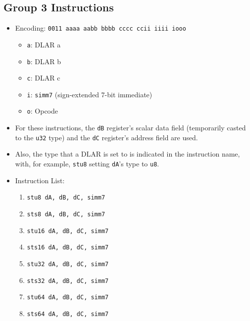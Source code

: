 \documentclass{article}
\begin{document}
	\subsection{Group 3 Instructions}
		\begin{itemize}
		\item Encoding: \texttt{0011 aaaa aabb bbbb  cccc ccii iiii iooo}
			\begin{itemize}
			\item \texttt{a}: DLAR a
			\item \texttt{b}: DLAR b
			\item \texttt{c}: DLAR c
			\item \texttt{i}: \texttt{simm7} (sign-extended 7-bit
				immediate)
			\item \texttt{o}: Opcode
			\end{itemize}
		\item For these instructions, the \texttt{dB} register's scalar
			data field (temporarily casted to the \texttt{u32} type) and
			the \texttt{dC} register's address field are used. 
		\item Also, the type that a DLAR is set to is indicated in the
			instruction name, with, for example, \texttt{stu8} setting
			\texttt{dA}'s type to \texttt{u8}.
		\item Instruction List:
			\begin{enumerate}
			\item \texttt{stu8 dA, dB, dC, simm7}
			\item \texttt{sts8 dA, dB, dC, simm7}
			\item \texttt{stu16 dA, dB, dC, simm7}
			\item \texttt{sts16 dA, dB, dC, simm7}
			\item \texttt{stu32 dA, dB, dC, simm7}
			\item \texttt{sts32 dA, dB, dC, simm7}
			\item \texttt{stu64 dA, dB, dC, simm7}
			\item \texttt{sts64 dA, dB, dC, simm7}
			\end{enumerate}
		\end{itemize}
		\newpage
\end{document}
